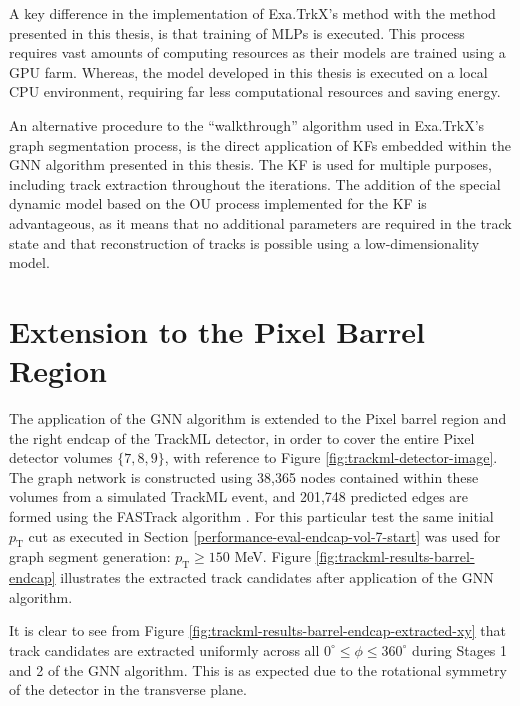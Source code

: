 A key difference in the implementation of Exa.TrkX’s method with the method presented in this thesis, is that training of MLPs is executed. This process requires vast amounts of computing resources as their models are trained using a GPU farm. Whereas, the model developed in this thesis is executed on a local CPU environment, requiring far less computational resources and saving energy.

An alternative procedure to the “walkthrough” algorithm used in Exa.TrkX’s graph segmentation process, is the direct application of KFs embedded within the GNN algorithm presented in this thesis. The KF is used for multiple purposes, including track extraction throughout the iterations. The addition of the special dynamic model based on the OU process implemented for the KF is advantageous, as it means that no additional parameters are required in the track state and that reconstruction of tracks is possible using a low-dimensionality model.










\section{Extension to the Pixel Barrel Region}
\label{chapter-7-outlook}


The application of the GNN algorithm is extended to the Pixel barrel region and the right endcap of the TrackML detector, in order to cover the entire Pixel detector volumes $\{7, 8, 9\}$, with reference to Figure \ref{fig:trackml-detector-image}. The graph network is constructed using 38,365 nodes contained within these volumes from a simulated TrackML event, and 201,748 predicted edges are formed using the FASTrack algorithm \cite{Dmitry-fasttrack-addtest}. For this particular test the same initial $p_{\text{T}}$ cut as executed in Section \ref{performance-eval-endcap-vol-7-start} was used for graph segment generation: $p_{\text{T}} \ge 150$ MeV. Figure \ref{fig:trackml-results-barrel-endcap} illustrates the extracted track candidates after application of the GNN algorithm. 

It is clear to see from Figure \ref{fig:trackml-results-barrel-endcap-extracted-xy} that track candidates are extracted uniformly across all $ 0^{\circ} \leq \phi \leq 360^{\circ}$ during Stages 1 and 2 of the GNN algorithm. This is as expected due to the rotational symmetry of the detector in the transverse plane. 


